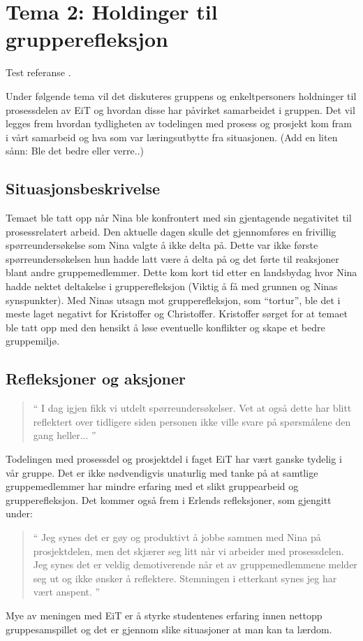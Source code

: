\chapter{Tema 2: Holdinger til grupperefleksjon}

Test referanse \cite{tdt4856}.

Under følgende tema vil det diskuteres gruppens og enkeltpersoners holdninger til prosessdelen av EiT og hvordan
disse har påvirket samarbeidet i gruppen. Det vil legges frem hvordan tydligheten av todelingen med prosess og 
prosjekt kom fram i vårt samarbeid og hva som var læringsutbytte fra situasjonen. (Add en liten sånn: Ble det bedre eller verre..)

\section{Situasjonsbeskrivelse}

Temaet ble tatt opp når Nina ble konfrontert med sin gjentagende negativitet til prosessrelatert arbeid. Den aktuelle 
dagen skulle det gjennomføres en frivillig spørreundersøkelse som Nina valgte å ikke delta på. Dette var ikke første 
spørreundersøkelsen hun hadde latt være å delta på og det førte til reaksjoner blant andre gruppemedlemmer. 
Dette kom kort tid etter en landsbydag hvor Nina hadde nektet deltakelse i grupperefleksjon (Viktig å få med 
grunnen og Ninas synspunkter). Med Ninas utsagn mot grupperefleksjon, som ``tortur'', ble det i meste laget
negativt for Kristoffer og Christoffer. Kristoffer sørget for at temaet ble tatt opp med den hensikt å løse eventuelle
konflikter og skape et bedre gruppemiljø. 

\section{Refleksjoner og aksjoner}


\begin{quote}``
I dag igjen fikk vi utdelt spørreundersøkelser. Vet at også dette har blitt reflektert over tidligere siden personen ikke 
ville svare på spørsmålene den gang heller... 
''\end{quote} 


Todelingen med prosessdel og prosjektdel i faget EiT har vært ganske tydelig i vår gruppe. Det er ikke 
nødvendigvis unaturlig med tanke på at samtlige gruppemedlemmer har mindre erfaring med et slikt gruppearbeid 
og grupperefleksjon. Det kommer også frem i Erlends refleksjoner, som gjengitt under:
\begin{quote}``
Jeg synes det er gøy og produktivt å jobbe sammen med Nina på prosjektdelen, men det skjærer seg litt når vi 
arbeider med prosessdelen. Jeg synes det er veldig demotiverende når et av gruppemedlemmene melder seg ut 
og ikke ønsker å reflektere. Stemningen i etterkant synes jeg har vært anspent.
''\end{quote} 
Mye av meningen med EiT er å styrke studentenes erfaring innen nettopp gruppesamspillet og det er gjennom
slike situasjoner at man kan ta lærdom. 

